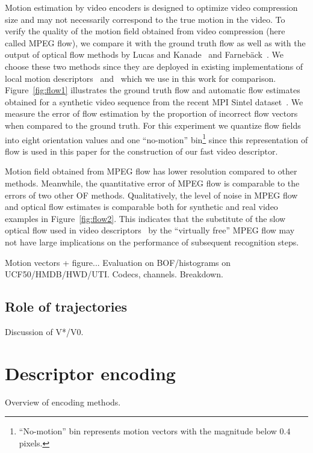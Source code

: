 \documentclass[10pt,twocolumn,letterpaper]{article}
\begin{document}
Motion estimation by video encoders is designed to optimize video compression size and may not necessarily correspond to the true motion in the video. To verify the quality of the motion field obtained from video compression (here called MPEG flow), we compare it with the ground truth flow as well as with the output of optical flow methods by Lucas and Kanade~\cite{Lucas81} and Farneb\"ack~\cite{Farneback03}. We choose these two methods since they are deployed in existing implementations of local motion descriptors~\cite{Laptev08} and~\cite{Wang12} which we use in this work for comparison. Figure~\ref{fig:flow1} illustrates the ground truth flow and automatic flow estimates obtained for a synthetic video sequence from the recent MPI Sintel dataset~\cite{Butler12}. We measure the error of flow estimation by the proportion of incorrect flow vectors when compared to the ground truth. For this experiment we quantize flow fields into eight orientation values and one ``no-motion'' bin\footnote{``No-motion'' bin represents motion vectors with the magnitude below $0.4$ pixels.} since this representation of flow is used in this paper for the construction of our fast video descriptor.

Motion field obtained from MPEG flow has lower resolution compared to other methods. 
Meanwhile, the quantitative error of MPEG flow is comparable to the errors of two other OF methods. Qualitatively, the level of noise in MPEG flow and optical flow estimates is comparable both for synthetic and real video examples in Figure~\ref{fig:flow2}. This indicates that the substitute of the slow optical flow used in video descriptors~\cite{Laptev08,Wang12} by the ``virtually free'' MPEG flow may not have large implications on the performance of subsequent recognition steps.

Motion vectors + figure... Evaluation on BOF/histograms on
UCF50/HMDB/HWD/UTI. Codecs, channels. Breakdown.

\subsection{Role of trajectories}
Discussion of V*/V0.


\section{Descriptor encoding}
\label{sec:quantization}
Overview of encoding methods.
\end{document}
